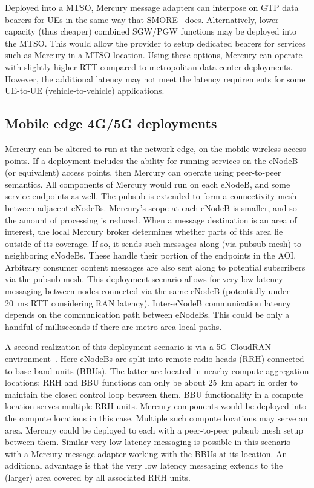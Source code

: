 Deployed into a MTSO, Mercury message adapters can interpose on GTP
data bearers for UEs in the same way that SMORE~\cite{cho2014smore}
does. Alternatively, lower-capacity (thus cheaper) combined SGW/PGW
functions may be deployed into the MTSO. This would allow the provider
to setup dedicated bearers for services such as Mercury in a MTSO
location.  Using these options, Mercury can operate with slightly
higher RTT compared to metropolitan data center deployments.  However,
the additional latency may not meet the latency requirements for some
UE-to-UE (vehicle-to-vehicle) applications.

\subsection{Mobile edge 4G/5G deployments}

Mercury can be altered to run at the network edge, on the mobile
wireless access points.  If a deployment includes the ability for
running services on the eNodeB (or equivalent) access points, then
Mercury can operate using peer-to-peer semantics.  All components of
Mercury would run on each eNodeB, and some service endpoints as
well. The pubsub is extended to form a connectivity mesh between
adjacent eNodeBs. Mercury's scope at each eNodeB is smaller, and so
the amount of processing is reduced. When a message destination is an
area of interest, the local Mercury broker determines whether parts of
this area lie outside of its coverage.  If so, it sends such messages
along (via pubsub mesh) to neighboring eNodeBs. These handle their
portion of the endpoints in the AOI.  Arbitrary consumer content
messages are also sent along to potential subscribers via the pubsub
mesh.  This deployment scenario allows for very low-latency messaging
between nodes connected via the same eNodeB (potentially under 20~ms
RTT considering RAN latency). Inter-eNodeB communication latency
depends on the communication path between eNodeBs.  This could be only
a handful of milliseconds if there are metro-area-local paths.

A second realization of this deployment scenario is via a 5G CloudRAN
environment~\cite{checko2015cloud}. Here eNodeBs are split into remote radio
heads (RRH) connected to base band units (BBUs).  The latter are
located in nearby compute aggregation locations; RRH and BBU functions
can only be about 25~km apart in order to maintain the closed control
loop between them. BBU functionality in a compute location serves
multiple RRH units. Mercury components would be deployed into the
compute locations in this case.  Multiple such compute locations may
serve an area. Mercury could be deployed to each with a peer-to-peer
pubsub mesh setup between them.  Similar very low latency messaging is
possible in this scenario with a Mercury message adapter working with
the BBUs at its location.  An additional advantage is that the very
low latency messaging extends to the (larger) area covered by all
associated RRH units.
